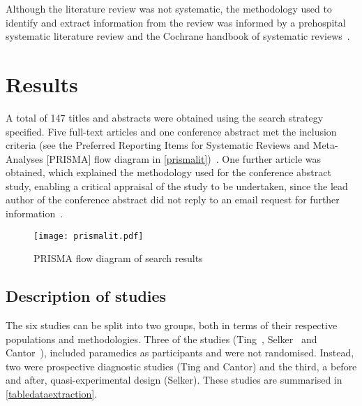 Although the literature review was not systematic, the methodology used to identify and extract information from the review was informed by a prehospital systematic literature review and the Cochrane handbook of systematic reviews~\citep{jensen_comparison_2010,the_cochrane_collaboration_cochrane_2011}. 

\section{Results}
\label{results}

A total of 147 titles and abstracts were obtained using the search strategy specified. Five full-text articles and one conference abstract met the inclusion criteria (see the Preferred Reporting Items for Systematic Reviews and Meta-Analyses [PRISMA] flow diagram in \autoref{prismalit})~\citep{goodacre_computer_2001,massel_observer_2003,tsai_computer_2003,ting_abstract_2009,selker_emergency_2011,cantor_prehospital_2012}. One further article was obtained, which explained the methodology used for the conference abstract study, enabling a critical appraisal of the study to be undertaken, since the lead author of the conference abstract did not reply to an email request for further information~\citep{nestler_impact_2011}.

\begin{figure}[htbp]
\centering
\texttt{[image: prismalit.pdf]}
\caption{PRISMA flow diagram of search results}
\label{prismalit}
\end{figure}



\subsection{Description of studies}
\label{descriptionofstudies}

The six studies can be split into two groups, both in terms of their respective populations and methodologies. Three of the studies (Ting~\citep{ting_abstract_2009}, Selker~\citep{selker_emergency_2011} and Cantor~\citep{cantor_prehospital_2012}), included paramedics as participants and were not randomised. Instead, two were prospective diagnostic studies (Ting and Cantor) and the third, a before and after, quasi-experimental design (Selker). These studies are summarised in \autoref{tabledataextraction}.

  

